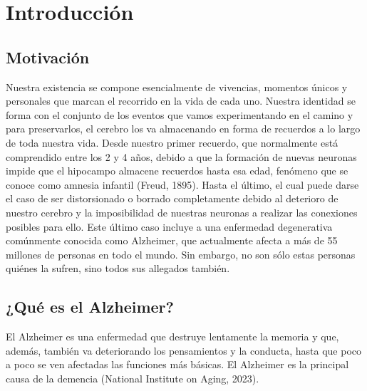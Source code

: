 \chapter{Introducción}
\label{cap:introduccion}


\section{Motivación}

Nuestra existencia se compone esencialmente de vivencias, momentos únicos y personales que marcan el recorrido en la vida de cada uno. Nuestra identidad se forma con el conjunto de los eventos que vamos experimentando en el camino y para preservarlos, el cerebro los va almacenando en forma de recuerdos a lo largo de toda nuestra vida.  Desde nuestro primer recuerdo, que normalmente está comprendido entre los 2 y 4 años, debido a que la formación de nuevas neuronas impide que el hipocampo almacene recuerdos hasta esa edad, fenómeno que se conoce como amnesia infantil (Freud, 1895). Hasta el último, el cual puede darse el caso de ser distorsionado o borrado completamente debido al deterioro de nuestro cerebro y la imposibilidad de nuestras neuronas a realizar las conexiones posibles para ello. Este último caso incluye a una enfermedad degenerativa comúnmente conocida como Alzheimer, que actualmente afecta a más de 55 millones de personas en todo el mundo. Sin embargo, no son sólo estas personas quiénes la sufren, sino todos sus allegados también. \\

\section{¿Qué es el Alzheimer?}

El Alzheimer es una enfermedad que destruye lentamente la memoria y que, además, también va deteriorando los pensamientos y la conducta, hasta que poco a poco se ven afectadas las funciones más básicas. El Alzheimer es la principal causa de la demencia (National Institute on Aging, 2023).\\

